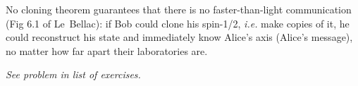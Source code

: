 \documentclass[12pt]{article}
\begin{document}

No cloning theorem guarantees that there is no
faster-than-light communication (Fig 6.1 of Le~Bellac): 
if Bob could clone his spin-1/2,
\textit{i.e.} make copies of it, he could reconstruct
his state and immediately know Alice's
axis (Alice's message), no matter how far apart
their laboratories are.


\emph{See problem in list of exercises.}
\end{document}
